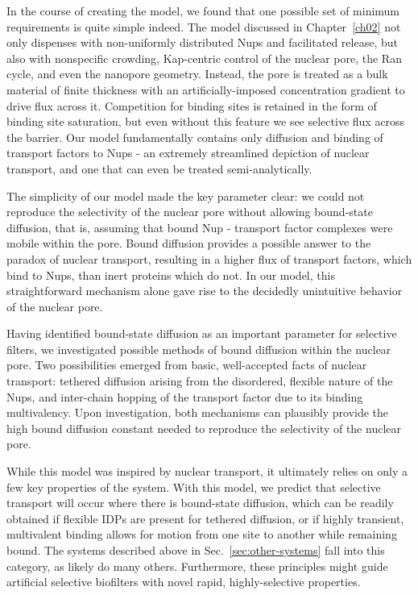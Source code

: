 In the course of creating the model, we found that one possible set of minimum requirements is quite simple indeed.  The model discussed in Chapter~\ref{ch02} not only dispenses with non-uniformly distributed Nups and facilitated release, but also with nonspecific crowding, Kap-centric control of the nuclear pore, the Ran cycle, and even the nanopore geometry.  Instead, the pore is treated as a bulk material of finite thickness with an artificially-imposed concentration gradient to drive flux across it.  Competition for binding sites is retained in the form of binding site saturation, but even without this feature we see selective flux across the barrier.  Our model fundamentally contains only diffusion and binding of transport factors to Nups - an extremely streamlined depiction of nuclear transport, and one that can even be treated semi-analytically.

The simplicity of our model made the key parameter clear: we could not reproduce the selectivity of the nuclear pore without allowing bound-state diffusion, that is, assuming that bound Nup - transport factor complexes were mobile within the pore.  Bound diffusion provides a possible answer to the paradox of nuclear transport, resulting in a higher flux of transport factors, which bind to Nups, than inert proteins which do not.  In our model, this straightforward mechanism alone gave rise to the decidedly unintuitive behavior of the nuclear pore.

Having identified bound-state diffusion as an important parameter for selective filters, we investigated possible methods of bound diffusion within the nuclear pore.  Two possibilities emerged from basic, well-accepted facts of nuclear transport: tethered diffusion arising from the disordered, flexible nature of the Nups, and inter-chain hopping of the transport factor due to its binding multivalency.  Upon investigation, both mechanisms can plausibly provide the high bound diffusion constant needed to reproduce the selectivity of the nuclear pore.

While this model was inspired by nuclear transport, it ultimately relies on only a few key properties of the system.  With this model, we predict that selective transport will occur where there is bound-state diffusion, which can be readily obtained if flexible IDPs are present for tethered diffusion, or if highly transient, multivalent binding allows for motion from one site to another while remaining bound.  The systems described above in Sec.~\ref{sec:other-systems} fall into this category, as likely do many others.  Furthermore, these principles might guide artificial selective biofilters with novel rapid, highly-selective properties.

